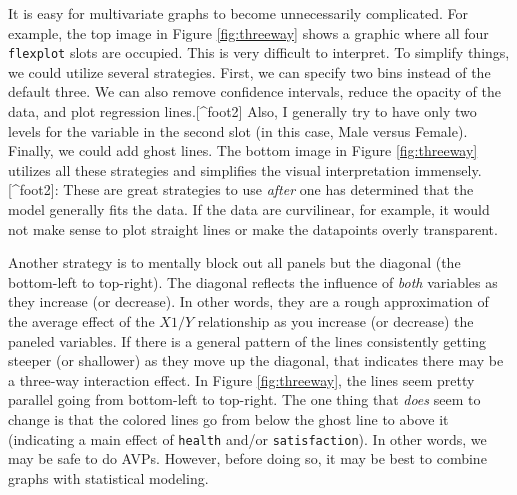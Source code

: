 \documentclass[
  man]{apa6}
\begin{document}
It is easy for multivariate graphs to become unnecessarily complicated. For example, the top image in Figure \ref{fig:threeway} shows a graphic where all four \texttt{flexplot} slots are occupied. This is very difficult to interpret. To simplify things, we could utilize several strategies. First, we can specify two bins instead of the default three. We can also remove confidence intervals, reduce the opacity of the data, and plot regression lines.{[}\^{}foot2{]} Also, I generally try to have only two levels for the variable in the second slot (in this case, Male versus Female). Finally, we could add ghost lines. The bottom image in Figure \ref{fig:threeway} utilizes all these strategies and simplifies the visual interpretation immensely.
{[}\^{}foot2{]}: These are great strategies to use \emph{after} one has determined that the model generally fits the data. If the data are curvilinear, for example, it would not make sense to plot straight lines or make the datapoints overly transparent.

Another strategy is to mentally block out all panels but the diagonal (the bottom-left to top-right). The diagonal reflects the influence of \emph{both} variables as they increase (or decrease). In other words, they are a rough approximation of the average effect of the \(X1/Y\) relationship as you increase (or decrease) the paneled variables. If there is a general pattern of the lines consistently getting steeper (or shallower) as they move up the diagonal, that indicates there may be a three-way interaction effect. In Figure \ref{fig:threeway}, the lines seem pretty parallel going from bottom-left to top-right. The one thing that \emph{does} seem to change is that the colored lines go from below the ghost line to above it (indicating a main effect of \texttt{health} and/or \texttt{satisfaction}). In other words, we may be safe to do AVPs. However, before doing so, it may be best to combine graphs with statistical modeling.

\small
\end{document}
